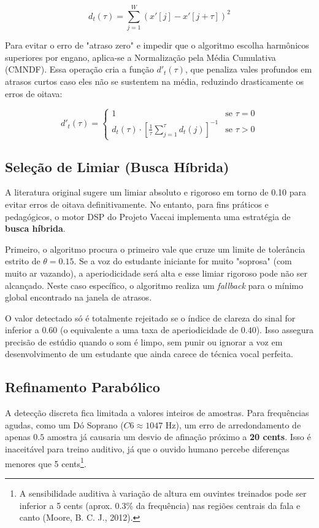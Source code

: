 \documentclass[11pt, a4paper]{article}
\theoremstyle{plain}
\theoremstyle{definition}
\begin{document}
\begin{equation}
    d_t(\tau) = \sum_{j=1}^{W} (x'[j] - x'[j+\tau])^2
\end{equation}

Para evitar o erro de "atraso zero" e impedir que o algoritmo escolha harmônicos superiores por engano, aplica-se a Normalização pela Média Cumulativa (CMNDF). Essa operação cria a função $d'_t(\tau)$, que penaliza vales profundos em atrasos curtos caso eles não se sustentem na média, reduzindo drasticamente os erros de oitava:

\begin{equation}
    d'_t(\tau) = \begin{cases} 
    1 & \text{se } \tau = 0 \\ 
    d_t(\tau) \cdot \left[ \frac{1}{\tau} \sum_{j=1}^{\tau} d_t(j) \right]^{-1} & \text{se } \tau > 0 
    \end{cases}
\end{equation}

\subsection{Seleção de Limiar (Busca Híbrida)}

A literatura original sugere um limiar absoluto e rigoroso em torno de 0.10 para evitar erros de oitava definitivamente. No entanto, para fins práticos e pedagógicos, o motor DSP do Projeto Vaccai implementa uma estratégia de \textbf{busca híbrida}. 

Primeiro, o algoritmo procura o primeiro vale que cruze um limite de tolerância estrito de $\theta = 0.15$. Se a voz do estudante iniciante for muito "soprosa" (com muito ar vazando), a aperiodicidade será alta e esse limiar rigoroso pode não ser alcançado. Neste caso específico, o algoritmo realiza um \textit{fallback} para o mínimo global encontrado na janela de atrasos. 

O valor detectado só é totalmente rejeitado se o índice de clareza do sinal for inferior a $0.60$ (o equivalente a uma taxa de aperiodicidade de $0.40$). Isso assegura precisão de estúdio quando o som é limpo, sem punir ou ignorar a voz em desenvolvimento de um estudante que ainda carece de técnica vocal perfeita.

\subsection{Refinamento Parabólico}
A detecção discreta fica limitada a valores inteiros de amostras. Para frequências agudas, como um Dó Soprano ($C6 \approx 1047$ Hz), um erro de arredondamento de apenas $0.5$ amostra já causaria um desvio de afinação próximo a \textbf{20 cents}. Isso é inaceitável para treino auditivo, já que o ouvido humano percebe diferenças menores que 5 cents\footnote{A sensibilidade auditiva à variação de altura em ouvintes treinados pode ser inferior a 5 cents (aprox. 0.3\% da frequência) nas regiões centrais da fala e canto (Moore, B. C. J., 2012).}.
\end{document}
